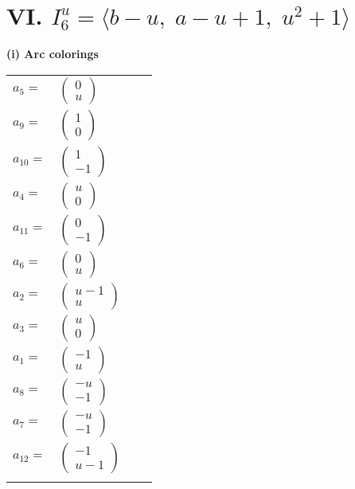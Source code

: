 \documentclass[1p]{elsarticle_modified}
\theoremstyle{definition}
\begin{document}
\centering \section*{VI. $I^u_{6}= \langle b- u,\;a- u+1,\;u^2+1 \rangle$}
\flushleft \textbf{(i) Arc colorings}\\
\begin{tabular}{m{7pt} m{180pt} m{7pt} m{180pt} }
\flushright $a_{5}=$&$\begin{pmatrix}0\\u\end{pmatrix}$ \\
\flushright $a_{9}=$&$\begin{pmatrix}1\\0\end{pmatrix}$ \\
\flushright $a_{10}=$&$\begin{pmatrix}1\\-1\end{pmatrix}$ \\
\flushright $a_{4}=$&$\begin{pmatrix}u\\0\end{pmatrix}$ \\
\flushright $a_{11}=$&$\begin{pmatrix}0\\-1\end{pmatrix}$ \\
\flushright $a_{6}=$&$\begin{pmatrix}0\\u\end{pmatrix}$ \\
\flushright $a_{2}=$&$\begin{pmatrix}u-1\\u\end{pmatrix}$ \\
\flushright $a_{3}=$&$\begin{pmatrix}u\\0\end{pmatrix}$ \\
\flushright $a_{1}=$&$\begin{pmatrix}-1\\u\end{pmatrix}$ \\
\flushright $a_{8}=$&$\begin{pmatrix}- u\\-1\end{pmatrix}$ \\
\flushright $a_{7}=$&$\begin{pmatrix}- u\\-1\end{pmatrix}$ \\
\flushright $a_{12}=$&$\begin{pmatrix}-1\\u-1\end{pmatrix}$\\&\end{tabular}
\end{document}
